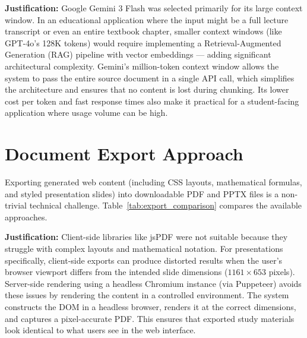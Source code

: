 \textbf{Justification:} Google Gemini 3 Flash was selected primarily for its large context window. In an educational application where the input might be a full lecture transcript or even an entire textbook chapter, smaller context windows (like GPT-4o's 128K tokens) would require implementing a Retrieval-Augmented Generation (RAG) pipeline with vector embeddings — adding significant architectural complexity. Gemini's million-token context window allows the system to pass the entire source document in a single API call, which simplifies the architecture and ensures that no content is lost during chunking. Its lower cost per token and fast response times also make it practical for a student-facing application where usage volume can be high.

\section{Document Export Approach}
Exporting generated web content (including CSS layouts, mathematical formulas, and styled presentation slides) into downloadable PDF and PPTX files is a non-trivial technical challenge. Table~\ref{tab:export_comparison} compares the available approaches.

\begin{table}[htbp]
\centering
{}
\vspace{6pt}
\caption{Comparison of PDF export methods.}
\label{tab:export_comparison}
\end{table}

\textbf{Justification:} Client-side libraries like jsPDF were not suitable because they struggle with complex layouts and mathematical notation. For presentations specifically, client-side exports can produce distorted results when the user's browser viewport differs from the intended slide dimensions ($1161 \times 653$ pixels). Server-side rendering using a headless Chromium instance (via Puppeteer) avoids these issues by rendering the content in a controlled environment. The system constructs the DOM in a headless browser, renders it at the correct dimensions, and captures a pixel-accurate PDF. This ensures that exported study materials look identical to what users see in the web interface.

